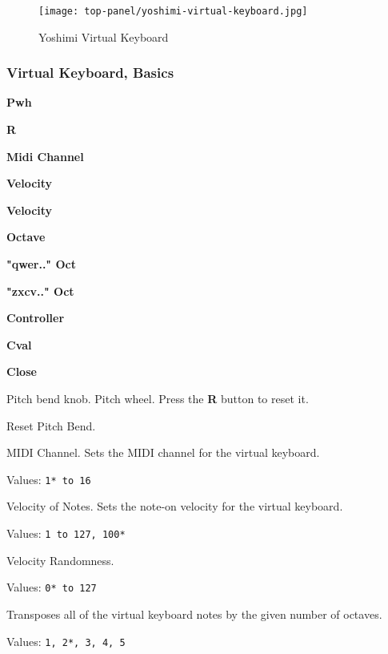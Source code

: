 \begin{figure}[H]
   \centering 
   \texttt{[image: top-panel/yoshimi-virtual-keyboard.jpg]}
   \caption{Yoshimi Virtual Keyboard}
   \label{fig:yoshimi_virtual_keyboard}
\end{figure}

\subsubsection{Virtual Keyboard, Basics}
\label{subsubsec:virtual_keyboard_basics}

   \begin{enumber}
      \item \textbf{Pwh}
      \item \textbf{R}
      \item \textbf{Midi Channel}
      \item \textbf{Velocity}
      \item \textbf{Velocity}
      \item \textbf{Octave}
      \item \textbf{"qwer.." Oct}
      \item \textbf{"zxcv.." Oct}
      \item \textbf{Controller}
      \item \textbf{Cval}
      \item \textbf{Close}
   \end{enumber}

   Pitch bend knob. Pitch wheel.
   Press the \textbf{R} button to reset it.

   Reset Pitch Bend.

   MIDI Channel.
   Sets the MIDI channel for the virtual keyboard.

   Values: \texttt{1* to 16}

   Velocity of Notes.
   Sets the note-on velocity for the virtual keyboard.

   Values: \texttt{1 to 127, 100*}

   Velocity Randomness.

   Values: \texttt{0* to 127}

   Transposes all of the virtual keyboard notes by the given number of
   octaves.

   Values: \texttt{1, 2*, 3, 4, 5}

